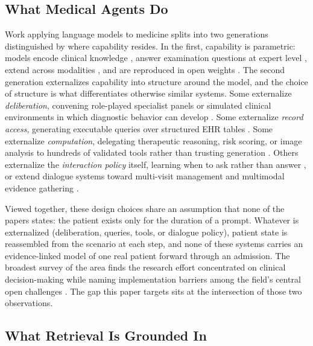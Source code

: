 \subsection{What Medical Agents Do}

Work applying language models to medicine splits into two generations distinguished by where
capability resides. In the first, capability is parametric: models encode clinical knowledge
\cite{singhal2023clinical}, answer examination questions at expert level \cite{singhal2025medpalm2},
extend across modalities \cite{tu2024generalist}, and are reproduced in open weights
\cite{toma2023clinicalcamel}. The second generation externalizes capability into structure around
the model, and the choice of structure is what differentiates otherwise similar systems.
Some externalize \emph{deliberation}, convening role-played specialist panels or simulated
clinical environments in which diagnostic behavior can develop
\cite{tang2024medagents,li2024agenthospital,schmidgall2024agentclinic}. Some externalize
\emph{record access}, generating executable queries over structured EHR tables \cite{shi2024ehragent}.
Some externalize \emph{computation}, delegating therapeutic reasoning, risk scoring, or image
analysis to hundreds of validated tools rather than trusting generation
\cite{gao2025txagent,liu2025riskagent,fallahpour2025medrax}. Others externalize the
\emph{interaction policy} itself, learning when to ask rather than answer \cite{feng2025doctoragent},
or extend dialogue systems toward multi-visit management and multimodal evidence gathering
\cite{palepu2025disease,saab2025multimodal}.

Viewed together, these design choices share an assumption that none of the papers states:
the patient exists only for the duration of a prompt. Whatever is externalized (deliberation,
queries, tools, or dialogue policy), patient state is reassembled from the scenario at each
step, and none of these systems carries an evidence-linked model of one real patient forward
through an admission. The broadest survey of the area finds the research effort concentrated on clinical
decision-making while naming implementation barriers among the field's central open
challenges \cite{wang2025baymax}. The gap this paper targets sits at the intersection of those
two observations.

\subsection{What Retrieval Is Grounded In}

